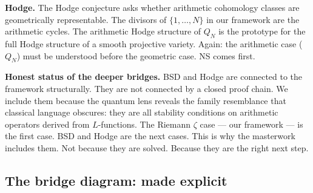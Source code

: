 \documentclass[12pt]{article}
\begin{document}
\medskip
\textbf{Hodge.}
The Hodge conjecture asks whether arithmetic cohomology classes
are geometrically representable.
The divisors of $\{1,\ldots,N\}$ in our framework are the arithmetic cycles.
The arithmetic Hodge structure of $Q_N$ is the prototype
for the full Hodge structure of a smooth projective variety.
Again: the arithmetic case ($Q_N$) must be understood before
the geometric case.
NS comes first.

\begin{tcolorbox}[warnbox]
\textbf{Honest status of the deeper bridges.}
BSD and Hodge are connected to the framework structurally.
They are not connected by a closed proof chain.
We include them because the quantum lens reveals the family resemblance
that classical language obscures: they are all stability conditions
on arithmetic operators derived from $L$-functions.
The Riemann $\zeta$ case --- our framework --- is the first case.
BSD and Hodge are the next cases.
This is why the masterwork includes them.
Not because they are solved. Because they are the right next step.
\end{tcolorbox}

\subsection{The bridge diagram: made explicit}
\label{sec:bridge-diagram}
\end{document}

